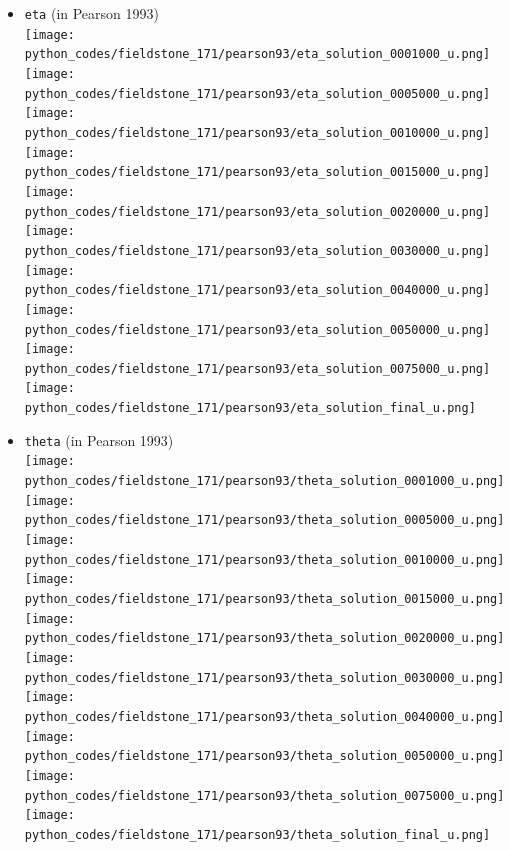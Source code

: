 \begin{itemize}
\item {\tt eta} (in Pearson 1993)\\
\texttt{[image: python\_codes/fieldstone\_171/pearson93/eta\_solution\_0001000\_u.png]}
\texttt{[image: python\_codes/fieldstone\_171/pearson93/eta\_solution\_0005000\_u.png]}
\texttt{[image: python\_codes/fieldstone\_171/pearson93/eta\_solution\_0010000\_u.png]}
\texttt{[image: python\_codes/fieldstone\_171/pearson93/eta\_solution\_0015000\_u.png]}
\texttt{[image: python\_codes/fieldstone\_171/pearson93/eta\_solution\_0020000\_u.png]}
\texttt{[image: python\_codes/fieldstone\_171/pearson93/eta\_solution\_0030000\_u.png]}
\texttt{[image: python\_codes/fieldstone\_171/pearson93/eta\_solution\_0040000\_u.png]}
\texttt{[image: python\_codes/fieldstone\_171/pearson93/eta\_solution\_0050000\_u.png]}
\texttt{[image: python\_codes/fieldstone\_171/pearson93/eta\_solution\_0075000\_u.png]}
\texttt{[image: python\_codes/fieldstone\_171/pearson93/eta\_solution\_final\_u.png]}

\item {\tt theta} (in Pearson 1993)\\
\texttt{[image: python\_codes/fieldstone\_171/pearson93/theta\_solution\_0001000\_u.png]}
\texttt{[image: python\_codes/fieldstone\_171/pearson93/theta\_solution\_0005000\_u.png]}
\texttt{[image: python\_codes/fieldstone\_171/pearson93/theta\_solution\_0010000\_u.png]}
\texttt{[image: python\_codes/fieldstone\_171/pearson93/theta\_solution\_0015000\_u.png]}
\texttt{[image: python\_codes/fieldstone\_171/pearson93/theta\_solution\_0020000\_u.png]}
\texttt{[image: python\_codes/fieldstone\_171/pearson93/theta\_solution\_0030000\_u.png]}
\texttt{[image: python\_codes/fieldstone\_171/pearson93/theta\_solution\_0040000\_u.png]}
\texttt{[image: python\_codes/fieldstone\_171/pearson93/theta\_solution\_0050000\_u.png]}
\texttt{[image: python\_codes/fieldstone\_171/pearson93/theta\_solution\_0075000\_u.png]}
\texttt{[image: python\_codes/fieldstone\_171/pearson93/theta\_solution\_final\_u.png]}










\end{itemize}
